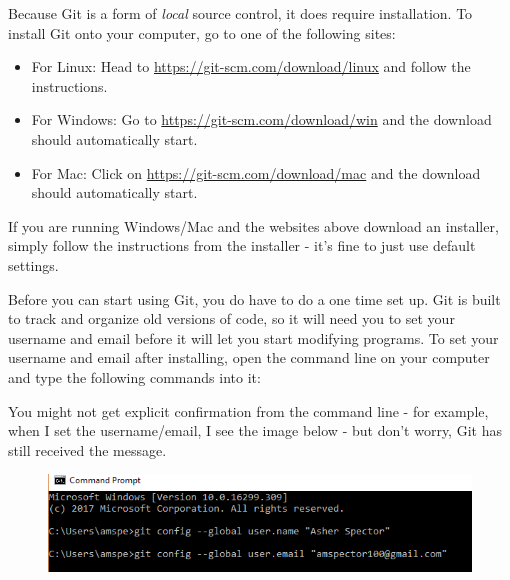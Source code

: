 \documentclass[]{book}
\newenvironment{Shaded}{\begin{snugshade}}{\end{snugshade}}
\newcommand{\StringTok}[1]{\textcolor[rgb]{0.31,0.60,0.02}{#1}}
\newcommand{\OperatorTok}[1]{\textcolor[rgb]{0.81,0.36,0.00}{\textbf{#1}}}
\newcommand{\NormalTok}[1]{#1}
\begin{document}
Because Git is a form of \emph{local} source control, it does require
installation. To install Git onto your computer, go to one of the
following sites:

\begin{itemize}
\item
  For Linux: Head to \url{https://git-scm.com/download/linux} and follow
  the instructions.
\item
  For Windows: Go to \url{https://git-scm.com/download/win} and the
  download should automatically start.
\item
  For Mac: Click on \url{https://git-scm.com/download/mac} and the
  download should automatically start.
\end{itemize}

If you are running Windows/Mac and the websites above download an
installer, simply follow the instructions from the installer - it's fine
to just use default settings.

Before you can start using Git, you do have to do a one time set up. Git
is built to track and organize old versions of code, so it will need you
to set your username and email before it will let you start modifying
programs. To set your username and email after installing, open the
command line on your computer and type the following commands into it:

\begin{Shaded}
\end{Shaded}

You might not get explicit confirmation from the command line - for
example, when I set the username/email, I see the image below - but
don't worry, Git has still received the message.

\begin{figure}
\centering
\includegraphics{images/configglobals.PNG}
\caption{}
\end{figure}
\end{document}
